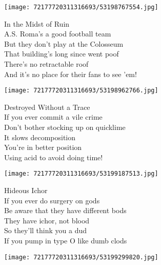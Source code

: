 \documentclass[10pt,letterpaper]{article}
\begin{document}
\begin{center}\texttt{[image: 72177720311316693/53198767554.jpg]}
\end{center}
\begin{center}
In the Midst of Ruin\\
\vskip 0.2in
A.S. Roma's a good football team\\
But they don't play at the Colosseum\\
That building's long since went poof\\
There's no retractable roof\\
And it's no place for their fans to see 'em!\\
\end{center}
\pagebreak

\begin{center}\texttt{[image: 72177720311316693/53198962766.jpg]}
\end{center}
\begin{center}
Destroyed Without a Trace\\
\vskip 0.2in
If you ever commit a vile crime\\
Don't bother stocking up on quicklime\\
It slows decomposition\\
You're in better position\\
Using acid to avoid doing time!\\
\end{center}
\pagebreak

\begin{center}
\texttt{[image: 72177720311316693/53199187513.jpg]}
\end{center}

\begin{center}
Hideous Ichor\\
\vskip 0.2in
If you ever do surgery on gods\\
Be aware that they have different bods\\
They have ichor, not blood\\
So they'll think you a dud\\
If you pump in type O like dumb clods\\
\end{center}
\pagebreak

\begin{center}
\texttt{[image: 72177720311316693/53199299820.jpg]}
\end{center}
\end{document}
